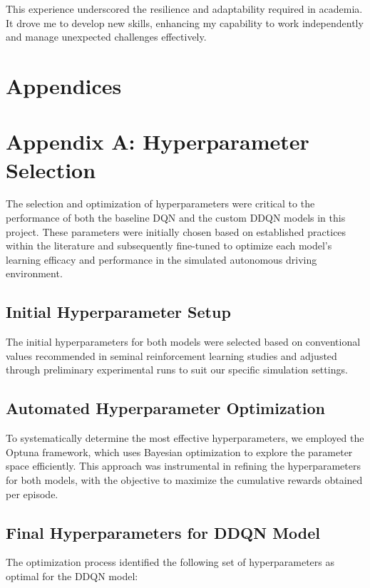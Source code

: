 \documentclass{article}
\begin{document}
This experience underscored the resilience and adaptability required in academia. It drove me to develop new skills, enhancing my capability to work independently and manage unexpected challenges effectively.

\small


\normalsize
\newpage
\section*{Appendices}
\section*{Appendix A: Hyperparameter Selection}

The selection and optimization of hyperparameters were critical to the performance of both the baseline DQN and the custom DDQN models in this project. These parameters were initially chosen based on established practices within the literature and subsequently fine-tuned to optimize each model's learning efficacy and performance in the simulated autonomous driving environment.

\subsection*{Initial Hyperparameter Setup}
The initial hyperparameters for both models were selected based on conventional values recommended in seminal reinforcement learning studies and adjusted through preliminary experimental runs to suit our specific simulation settings.

\subsection*{Automated Hyperparameter Optimization}
To systematically determine the most effective hyperparameters, we employed the Optuna framework, which uses Bayesian optimization to explore the parameter space efficiently. This approach was instrumental in refining the hyperparameters for both models, with the objective to maximize the cumulative rewards obtained per episode.

\subsection*{Final Hyperparameters for DDQN Model}
The optimization process identified the following set of hyperparameters as optimal for the DDQN model:
\end{document}
